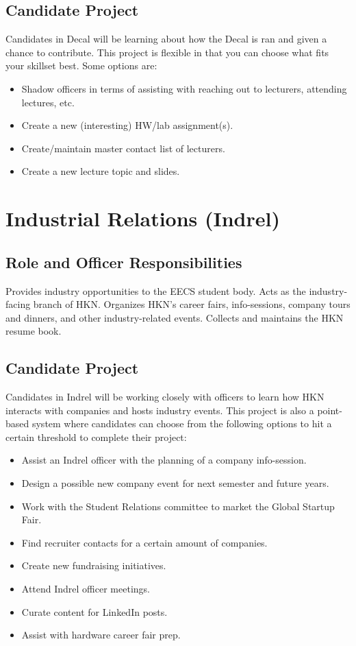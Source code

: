 \documentclass[11pt, article, oneside]{memoir}
\begin{document}
    \subsection{Candidate Project}
        Candidates in Decal will be learning about how the Decal is ran and given a chance to contribute.
        This project is flexible in that you can choose what fits your skillset best.
        Some options are:
        \begin{itemize}
            \item Shadow officers in terms of assisting with reaching out to lecturers, attending lectures, etc.
            \item Create a new (interesting) HW/lab assignment(s).
            \item Create/maintain master contact list of lecturers.
            \item Create a new lecture topic and slides.
        \end{itemize}

    \section{Industrial Relations (Indrel)}
    \subsection{Role and Officer Responsibilities}
        Provides industry opportunities to the EECS student body.
        Acts as the industry-facing branch of HKN.
        Organizes HKN's career fairs, info-sessions, company tours and dinners, and other industry-related events.
        Collects and maintains the HKN resume book.

    \subsection{Candidate Project}
    Candidates in Indrel will be working closely with officers to learn how HKN interacts with companies and hosts industry events.
    This project is also a point-based system where candidates can choose from the following options to hit a certain threshold to complete their project:
        \begin{itemize}
            \item Assist an Indrel officer with the planning of a company info-session.
            \item Design a possible new company event for next semester and future years.
            \item Work with the Student Relations committee to market the Global Startup Fair.
            \item Find recruiter contacts for a certain amount of companies.
            \item Create new fundraising initiatives.
            \item Attend Indrel officer meetings.
            \item Curate content for LinkedIn posts.
            \item Assist with hardware career fair prep.
        \end{itemize}
\end{document}
